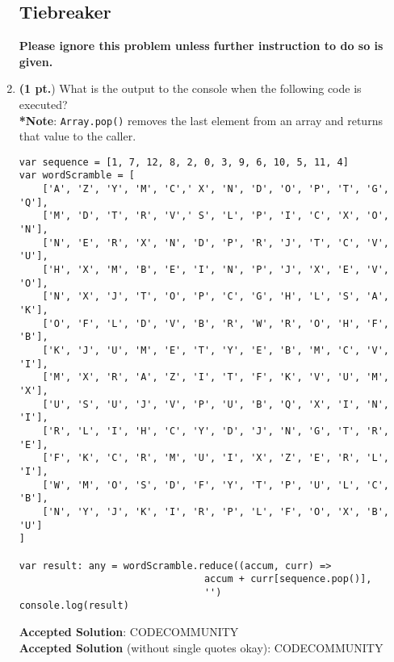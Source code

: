 \documentclass[12pt]{article}
\begin{document}
\begin{enumerate}
\newpage
\subsection{Tiebreaker}
\textbf{Please ignore this problem unless further instruction to do so is given.}

\item \textbf{(1 pt.}) What is the output to the console when the following code is executed? \\ \textbf{*Note}: \texttt{Array.pop()} removes the last element from an array and returns that value to the caller.


    
\begin{lstlisting}[style=JavaScript]
var sequence = [1, 7, 12, 8, 2, 0, 3, 9, 6, 10, 5, 11, 4]
var wordScramble = [
    ['A', 'Z', 'Y', 'M', 'C',' X', 'N', 'D', 'O', 'P', 'T', 'G', 'Q'],
    ['M', 'D', 'T', 'R', 'V',' S', 'L', 'P', 'I', 'C', 'X', 'O', 'N'],
    ['N', 'E', 'R', 'X', 'N', 'D', 'P', 'R', 'J', 'T', 'C', 'V', 'U'],
    ['H', 'X', 'M', 'B', 'E', 'I', 'N', 'P', 'J', 'X', 'E', 'V', 'O'],
    ['N', 'X', 'J', 'T', 'O', 'P', 'C', 'G', 'H', 'L', 'S', 'A', 'K'],
    ['O', 'F', 'L', 'D', 'V', 'B', 'R', 'W', 'R', 'O', 'H', 'F', 'B'],
    ['K', 'J', 'U', 'M', 'E', 'T', 'Y', 'E', 'B', 'M', 'C', 'V', 'I'],
    ['M', 'X', 'R', 'A', 'Z', 'I', 'T', 'F', 'K', 'V', 'U', 'M', 'X'],
    ['U', 'S', 'U', 'J', 'V', 'P', 'U', 'B', 'Q', 'X', 'I', 'N', 'I'],
    ['R', 'L', 'I', 'H', 'C', 'Y', 'D', 'J', 'N', 'G', 'T', 'R', 'E'],
    ['F', 'K', 'C', 'R', 'M', 'U', 'I', 'X', 'Z', 'E', 'R', 'L', 'I'],
    ['W', 'M', 'O', 'S', 'D', 'F', 'Y', 'T', 'P', 'U', 'L', 'C', 'B'],
    ['N', 'Y', 'J', 'K', 'I', 'R', 'P', 'L', 'F', 'O', 'X', 'B', 'U']
]

var result: any = wordScramble.reduce((accum, curr) =>
                                accum + curr[sequence.pop()], 
                                '')
console.log(result)
\end{lstlisting} 

\noindent \textbf{Accepted Solution}: \textquotesingle CODECOMMUNITY\textquotesingle \\
\noindent \textbf{Accepted Solution} (without single quotes okay):  CODECOMMUNITY


\end{enumerate}
\end{document}
